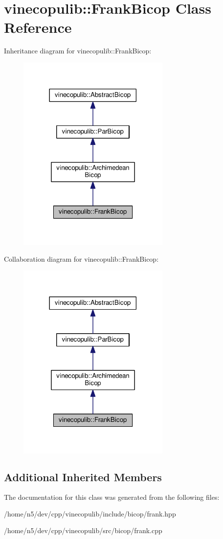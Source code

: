 \hypertarget{classvinecopulib_1_1_frank_bicop}{}\section{vinecopulib\+:\+:Frank\+Bicop Class Reference}
\label{classvinecopulib_1_1_frank_bicop}


Inheritance diagram for vinecopulib\+:\+:Frank\+Bicop\+:\nopagebreak
\begin{figure}[H]
\begin{center}
\leavevmode
\includegraphics[width=213pt]{classvinecopulib_1_1_frank_bicop__inherit__graph}
\end{center}
\end{figure}


Collaboration diagram for vinecopulib\+:\+:Frank\+Bicop\+:\nopagebreak
\begin{figure}[H]
\begin{center}
\leavevmode
\includegraphics[width=213pt]{classvinecopulib_1_1_frank_bicop__coll__graph}
\end{center}
\end{figure}
\subsection*{Additional Inherited Members}


The documentation for this class was generated from the following files\+:\begin{DoxyCompactItemize}
\item 
/home/n5/dev/cpp/vinecopulib/include/bicop/frank.\+hpp\item 
/home/n5/dev/cpp/vinecopulib/src/bicop/frank.\+cpp\end{DoxyCompactItemize}
